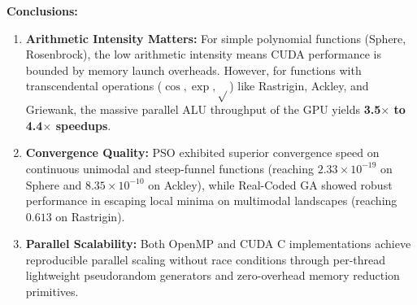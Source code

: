 \documentclass[12pt]{article}
\begin{document}
\textbf{Conclusions:}
\begin{enumerate}
    \item \textbf{Arithmetic Intensity Matters:} For simple polynomial functions (Sphere, Rosenbrock), the low arithmetic intensity means CUDA performance is bounded by memory launch overheads. However, for functions with transcendental operations ($\cos, \exp, \sqrt{}$) like Rastrigin, Ackley, and Griewank, the massive parallel ALU throughput of the GPU yields \textbf{3.5$\times$ to 4.4$\times$ speedups}.
    \item \textbf{Convergence Quality:} PSO exhibited superior convergence speed on continuous unimodal and steep-funnel functions (reaching $2.33 \times 10^{-19}$ on Sphere and $8.35 \times 10^{-10}$ on Ackley), while Real-Coded GA showed robust performance in escaping local minima on multimodal landscapes (reaching $0.613$ on Rastrigin).
    \item \textbf{Parallel Scalability:} Both OpenMP and CUDA C implementations achieve reproducible parallel scaling without race conditions through per-thread lightweight pseudorandom generators and zero-overhead memory reduction primitives.
\end{enumerate}
\end{document}
